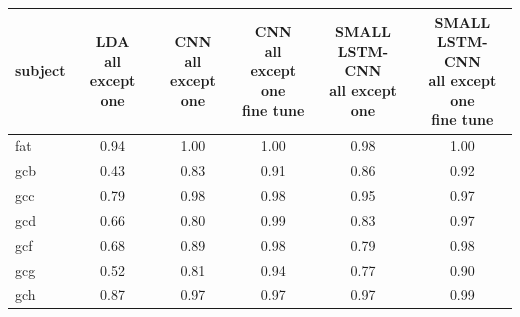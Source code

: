 \documentclass[
12pt, %
english, %
doublespacing, %
headsepline, %
]{MastersDoctoralThesis} %
\begin{document}
\begin{table}[t]
	\centering
	\label{table:AllExceptOne}	
	\begin{tabular}{l|ccccc}
		\toprule
		{subject} & \makecell{LDA \\all except\\one} &  \makecell{CNN\\all except\\one}&  \makecell{CNN\\all except\\one\\fine tune}& \makecell{SMALL\\LSTM-CNN\\all except\\one}&\makecell{SMALL\\LSTM-CNN\\all except \\one \\ fine tune} \\
		\midrule
		fat     &                  0.94 &                  1.00 &                            1.00 &                             0.98 &                                               1.00 \\
		gcb     &                  0.43 &                  0.83 &                            0.91 &                             0.86 &                                               0.92 \\
		gcc     &                  0.79 &                  0.98 &                            0.98 &                             0.95 &                                               0.97 \\
		gcd     &                  0.66 &                  0.80 &                            0.99 &                             0.83 &                                               0.97 \\
		gcf     &                  0.68 &                  0.89 &                            0.98 &                             0.79 &                                               0.98 \\
		gcg     &                  0.52 &                  0.81 &                            0.94 &                             0.77 &                                               0.90 \\
		gch     &                  0.87 &                  0.97 &                            0.97 &                             0.97 &                                               0.99 \\

\end{tabular}
\end{table}
\end{document}
